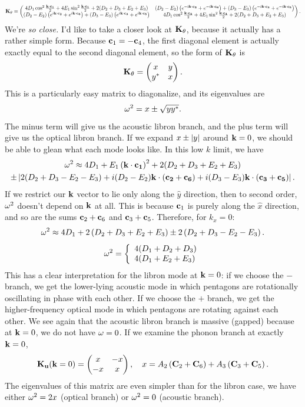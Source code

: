 \documentclass[12pt]{article}
\begin{document}
\[ \Scale[0.8]{\bv K_\th = \pmtrx{ 4D_1 \cos^2 \half{\Dot{k}{c_1}} + 4E_1 
\sin^2 \half{\Dot{k}{c_1}} + 2(D_2+D_3+E_2+E_3) & 
(D_2-E_2)\paren{e^{-i\Dot{k}{c_2}} + e^{-i\Dot{k}{c_6}} } + 
(D_3-E_3)\paren{e^{-i\Dot{k}{c_3}} + e^{-i\Dot{k}{c_5}} } \\ 
(D_2-E_2)\paren{e^{i\Dot{k}{c_2}} + 
e^{i\Dot{k}{c_6}} } + (D_3-E_3)\paren{e^{i\Dot{k}{c_3}} + e^{i\Dot{k}{c_5}} 
} & 4D_1 \cos^2 \half{\Dot{k}{c_4}} + 4E_1 \sin^2 
\half{\Dot{k}{c_4}} + 2(D_2+D_3+E_2+E_3)}.}\]
We're \emph{so close.} I'd like to take a closer look at $\mathbf{K}_\theta$, because 
it actually has a rather simple form. Because $\mathbf{c}_1 = -\mathbf{c}_4$, the first 
diagonal element is actually exactly equal to the second diagonal element, so 
the form of $\mathbf{K}_\theta$ is
\[ \mathbf{K}_\theta = \left(\begin{matrix} x & y \\ y^* & x\end{matrix}\right).\]
This is a particularly easy matrix to diagonalize, and its eigenvalues are
\[ \omega^2 = x \pm \sqrt{yy^*}.\]
The minus term will give us the acoustic libron branch, and the plus term will 
give us the optical libron branch. If we expand $x\pm \left | y \right |$ around $\mathbf{k} = 
0$, we should be able to glean what each mode looks like. In this low $k$ 
limit, we have
\begin{multline*} \omega^2 \approx 4D_1 + E_1 \left(\mathbf{k}\cdot\mathbf{c_1}\right)^2 + 
2(D_2+D_3+E_2+E_3) \\ \pm \left |  2(D_2+D_3-E_2-E_3) + 
i(D_2-E_2)\mathbf{k}\cdot\mathbf{(c_2+c_6)}+i(D_3-E_3)\mathbf{k}\cdot\mathbf{(c_3+c_5)} \right |. \end{multline*}
If we restrict our $\mathbf{k}$ vector to lie only along the $\hat y$ direction, then to second order, $\omega^2$ doesn't depend on $\mathbf{k}$ at all. This is because $\mathbf{c}_1$ is purely along the $\hat x$ direction, and so are the sums $\mathbf{c}_2+\mathbf{c}_6$ and $\mathbf{c}_3 + \mathbf{c}_5$. Therefore, for $k_x=0$:
\[ \omega^2 \approx 4D_1 + 2\left(D_2+D_3 + E_2+E_3\right) \pm 2\left(D_2+D_3 - E_2-E_3\right).\]
\[ \omega^2 = \left\{\begin{array}{lr}
4(D_1+D_2+D_3) \\
4(D_1+E_2+E_3)
\end{array} \right. \]
This has a clear interpretation for the libron mode at $\mathbf{k}=0$: if we choose the $-$ branch, we get the lower-lying acoustic mode in which pentagons are rotationally oscillating in phase with each other. If we choose the $+$ branch, we get the higher-frequency optical mode in which pentagons are rotating against each other. We see again that the acoustic libron branch is massive (gapped) because at $\mathbf{k}=0$, we do not have $\omega = 0$. If we examine the phonon branch at exactly $\mathbf{k} = 0$,
\[ \mathbf{K}_{\mathbf{u}}(\mathbf{k} = 0) = \left(\begin{matrix}x & -x \\ -x & x\end{matrix}\right), \quad x = A_2\left(\mathbf{C}_2 + \mathbf{C}_6\right) + A_3 \left(\mathbf{C}_3 + \mathbf{C}_5\right).\]
The eigenvalues of this matrix are even simpler than for the libron case, we have either $\omega^2 = 2x$ (optical branch) or $\omega^2 = 0$ (acoustic branch).

\end{document}
